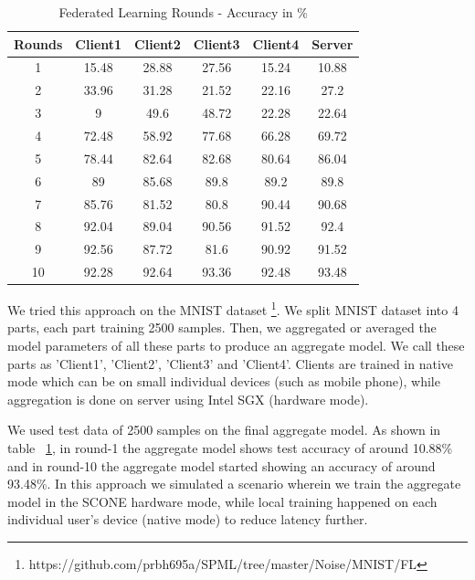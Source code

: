 \begin{table}[h!]
\begin{center}
\caption{Federated Learning Rounds - Accuracy in \%}
\label{tab:flrounds}
\begin{tabular}{|c|c|c|c|c|c|}
\hline
Rounds & Client1 & Client2 & Client3 & Client4 & Server \\
\hline
1      & 15.48   & 28.88   & 27.56   & 15.24   & 10.88  \\
\hline
2      & 33.96   & 31.28   & 21.52   & 22.16   & 27.2   \\
\hline
3      & 9       & 49.6    & 48.72   & 22.28   & 22.64  \\
\hline
4      & 72.48   & 58.92   & 77.68   & 66.28   & 69.72  \\
\hline
5      & 78.44   & 82.64   & 82.68   & 80.64   & 86.04  \\
\hline
6      & 89      & 85.68   & 89.8    & 89.2    & 89.8   \\
\hline
7      & 85.76   & 81.52   & 80.8    & 90.44   & 90.68  \\
\hline
8      & 92.04   & 89.04   & 90.56   & 91.52   & 92.4   \\
\hline
9      & 92.56   & 87.72   & 81.6    & 90.92   & 91.52  \\
\hline
10     & 92.28   & 92.64   & 93.36   & 92.48   & 93.48  \\
\hline
\end{tabular}
\end{center}
\end{table}

We tried this approach on the MNIST dataset \footnote{https://github.com/prbh695a/SPML/tree/master/Noise/MNIST/FL}. We split MNIST dataset into 4 parts, each part training 2500 samples. Then, we aggregated or averaged the model parameters of all these parts to produce an aggregate model. We call these parts as 'Client1', 'Client2', 'Client3' and 'Client4'. Clients are trained in native mode which can be on small individual devices (such as mobile phone), while aggregation is done on server using Intel SGX (hardware mode). 

We used test data of 2500 samples on the final aggregate model. As shown in table ~\ref{tab:flrounds}, in round-1 the aggregate model shows test accuracy of around 10.88\% and in round-10 the aggregate model started showing an accuracy of around 93.48\%. In this approach we simulated a scenario wherein we train the aggregate model in the SCONE hardware mode, while local training happened on each individual user's device (native mode) to reduce latency further.
